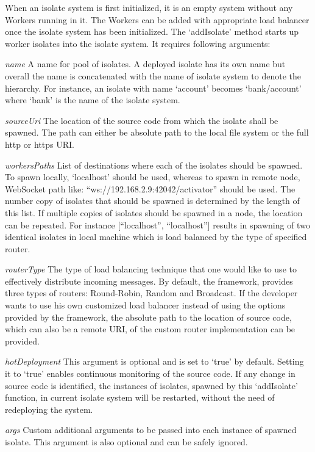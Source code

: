   When an isolate system is first initialized, it is an empty system without any Workers running in it. The Workers can be added with appropriate load balancer once the isolate system has been initialized. The ‘addIsolate’ method starts up worker isolates into the isolate system. It requires following arguments:
  \begin{description}
    \item{\itshape{name}} \textendash{} A name for pool of isolates. A deployed isolate has its own name but overall the name is concatenated with the name of isolate system to denote the hierarchy. For instance, an isolate with name ‘account’ becomes ‘bank/account’ where ‘bank’ is the name of the isolate system.
    \item{\itshape{sourceUri}} \textendash{} The location of the source code from which the isolate shall be spawned. The path can either be absolute path to the local file system or the full http or https URI.
    \item{\itshape{workersPaths}} \textendash{} List of destinations where each of the isolates should be spawned. To spawn locally, ‘localhost’ should be used, whereas to spawn in remote node, WebSocket path like: “ws://192.168.2.9:42042/activator” should be used. The number copy of isolates that should be spawned is determined by the length of this list. If multiple copies of isolates should be spawned in a node, the location can be repeated. For instance [“localhost”, “localhost”] results in spawning of two identical isolates in local machine which is load balanced by the type of specified router.
    \item{\itshape{routerType}} \textendash{} The type of load balancing technique that one would like to use to effectively distribute incoming messages. By default, the framework, provides three types of routers: Round-Robin, Random and Broadcast. If the developer wants to use his own customized load balancer instead of using the options provided by the framework, the absolute path to the location of source code, which can also be a remote URI, of the custom router implementation can be provided.
    \item{\itshape{hotDeployment}} \textendash{} This argument is optional and is set to ‘true’ by default. Setting it to ‘true’ enables continuous monitoring of the source code. If any change in source code is identified, the  instances of isolates, spawned by this ‘addIsolate’ function, in current isolate system will be restarted, without the need of redeploying the system.
    \item{\itshape{args}} \textendash{} Custom additional arguments to be passed into each instance of spawned isolate. This argument is also optional and can be safely ignored.
  \end{description}

